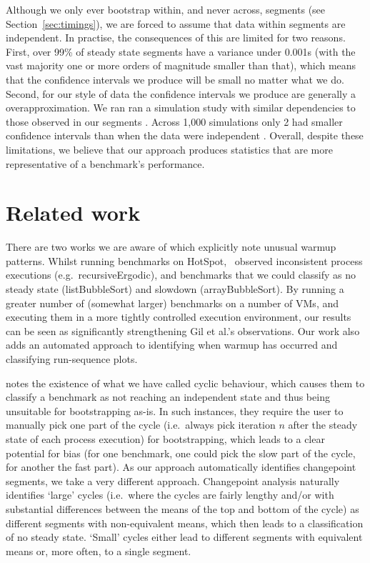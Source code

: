 \documentclass[acmsmall]{acmart}\settopmatter{printfolios=true}
\begin{document}
Although we only ever bootstrap within, and never across, segments (see
Section~\ref{sec:timings}), we are forced to assume that data within segments
are independent. In practise, the consequences of this are limited for two
reasons. First, over 99\% of steady state segments have a variance under 0.001s
(with the vast majority one or more orders of magnitude smaller than that),
which means that the confidence intervals we produce will be small no matter
what we do. Second, for our style of data the confidence intervals we
produce are generally a  overapproximation. We ran
ran a simulation study with similar dependencies to those observed in our segments . Across 
1,000 simulations only 2 had smaller confidence intervals than when the data were independent
. Overall, despite
these limitations, we believe that our approach produces statistics that are more representative of
a benchmark's performance.



\section{Related work}
\label{sec:related}

There are two works we are aware of which explicitly note unusual warmup
patterns. Whilst running benchmarks on HotSpot,~\citet{gil11microbenchmark}
observed inconsistent process executions
(e.g.~recursiveErgodic), and benchmarks that we could classify as no
steady state (listBubbleSort) and slowdown (arrayBubbleSort). By running a
greater number of (somewhat larger) benchmarks on a number of VMs, and executing
them in a more tightly controlled execution environment, our results can be seen
as significantly strengthening Gil et al.'s observations. Our work also adds an
automated approach to identifying when warmup has occurred and classifying
run-sequence plots.

\cite{kalibera13rigorous} notes the existence of what we have called cyclic behaviour, which
causes them to classify a benchmark as not reaching an independent state and
thus being unsuitable for bootstrapping as-is. In such instances, they require
the user to manually pick one part of the cycle (i.e.~always pick iteration $n$
after the steady state of each process execution) for bootstrapping, which leads
to a clear potential for bias (for one benchmark, one could pick the slow part
of the cycle, for another the fast part). As our approach automatically
identifies changepoint segments, we take a very different approach. Changepoint
analysis naturally identifies `large' cycles (i.e.~where the cycles are fairly
lengthy and/or with substantial differences between the means of the top and
bottom of the cycle) as different segments with non-equivalent means, which then
leads to a classification of no steady state. `Small' cycles either lead to
different segments with equivalent means or, more often, to a single segment.
\end{document}
